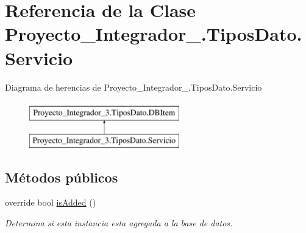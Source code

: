 \hypertarget{class_proyecto___integrador__3_1_1_tipos_dato_1_1_servicio}{\section{Referencia de la Clase Proyecto\-\_\-\-Integrador\-\_.\-Tipos\-Dato.\-Servicio}
\label{class_proyecto___integrador__3_1_1_tipos_dato_1_1_servicio}
}
Diagrama de herencias de Proyecto\-\_\-\-Integrador\-\_.\-Tipos\-Dato.\-Servicio\begin{figure}[H]
\begin{center}
\leavevmode
\includegraphics[height=2.000000cm]{class_proyecto___integrador__3_1_1_tipos_dato_1_1_servicio}
\end{center}
\end{figure}
\subsection*{Métodos públicos}
\begin{DoxyCompactItemize}
\item 
override bool \hyperlink{class_proyecto___integrador__3_1_1_tipos_dato_1_1_servicio_a84ccd70aa17d65df0afff55a14faeeec}{is\-Added} ()
\begin{DoxyCompactList}\small\item\em Determina si esta instancia esta agregada a la base de datos. \end{DoxyCompactList}\end{DoxyCompactItemize}
